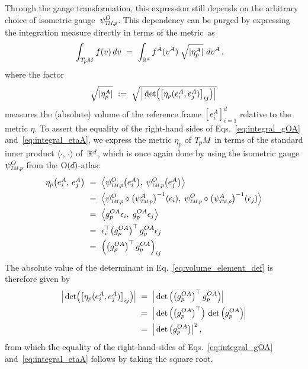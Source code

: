 Through the gauge transformation, this expression still depends on the arbitrary choice of isometric gauge~$\psiTMp^O$.
This dependency can be purged by expressing the integration measure directly in terms of the metric~as
\begin{align}\label{eq:integral_etaA}
    \int_{T_{\mkern-1.5mu p}\mkern-.5muM} f(v)\, dv
    \ &=\ \int_{\mathbb{R}^d} f^A(v^A)\; \sqrt{|\eta_p^A|}\ dv^A \,,
\end{align}
where the factor
\begin{align}\label{eq:volume_element_def}
    \sqrt{|\eta_p^A|}\ :=\ \sqrt{\mkern2mu \pig|\det\!\pig( \big[ \eta_p(e_i^A, e_j^A) \big]_{ij} \pig)\pig| \,}
\end{align}
measures the (absolute) volume of the reference frame $[e_i^A]_{i=1}^d$ relative to the metric $\eta$.
To assert the equality of the right-hand sides of Eqs.~\eqref{eq:integral_gOA} and~\eqref{eq:integral_etaA}, we express the metric $\eta_p$ of $T_{\mkern-1.5mu p}\mkern-.5muM$ in terms of the standard inner product $\langle\cdot,\, \cdot\rangle$ of~$\mathbb{R}^d$, which is once again done by using the isometric gauge $\psiTMp^O$ from the $\operatorname{O}(d)$-atlas:
\begin{align}
    \eta_p\big( e_i^A,\, e_j^A \big)
    \ &=\ \pig\langle \psiTMp^O\big( e_i^A\big),\; \psiTMp^O\big( e_j^A\big) \pig\rangle \notag \\
    \ &=\ \pig\langle \psiTMp^O \circ \big(\psiTMp^A \big)^{-1} (\epsilon_i),\; \psiTMp^O \circ \big(\psiTMp^A \big)^{-1} (\epsilon_j) \pig\rangle \notag \\
    \ &=\ \pig\langle g_p^{OA} \epsilon_i,\; g_p^{OA} \epsilon_j \pig\rangle \notag \\
    \ &=\ \epsilon_i^\top \big(g_p^{OA} \big)^\top \, g_p^{OA} \epsilon_j \notag \\
    \ &=\ \Big( \big(g_p^{OA} \big)^\top \, g_p^{OA} \Big)_{ij}
\end{align}
The absolute value of the determinant in Eq.~\eqref{eq:volume_element_def} is therefore given by
\begin{align}
    \pig|\det\!\pig( \big[ \eta_p(e_i^A, e_j^A) \big]_{ij} \pig)\pig|
    \ &=\ \pig| \det\pig( \big(g_p^{OA} \big)^\top \, g_p^{OA} \pig) \pig| \notag \\
    \ &=\ \pig| \det\pig( \big(g_p^{OA} \big)^\top \pig) \, \det\pig( g_p^{OA} \pig) \pig| \notag \\
    \ &=\ \pig| \det\big( g_p^{OA} \big) \big|^2 \,,
\end{align}
from which the equality of the right-hand-sides of Eqs.~\eqref{eq:integral_gOA} and~\eqref{eq:integral_etaA} follows by taking the square root.


